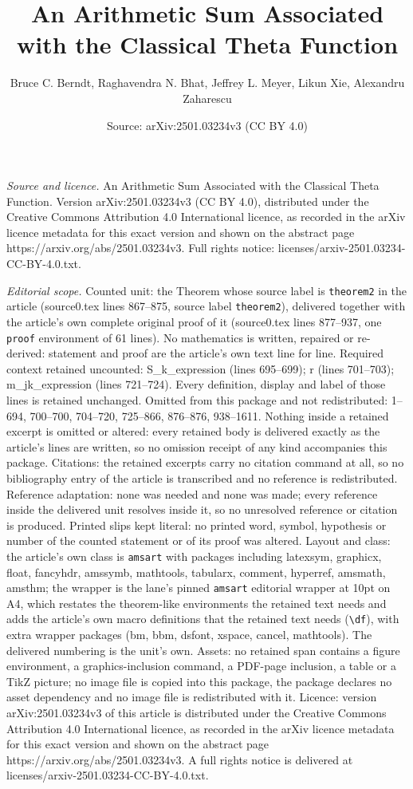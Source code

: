\documentclass[10pt,a4paper]{amsart}
\title[An Arithmetic Sum Associated with the Classical Theta Functi]{An Arithmetic Sum Associated with the Classical Theta Function}
\author{Bruce C. Berndt, Raghavendra N. Bhat, Jeffrey L. Meyer, Likun Xie, Alexandru Zaharescu}
\date{Source: arXiv:2501.03234v3 (CC BY 4.0)}
\begin{document}
\maketitle

\noindent\emph{Source and licence.} An Arithmetic Sum Associated with the Classical Theta Function. Version arXiv:2501.03234v3 (CC BY 4.0), distributed under the Creative Commons Attribution 4.0 International licence, as recorded in the arXiv licence metadata for this exact version and shown on the abstract page https://arxiv.org/abs/2501.03234v3. Full rights notice: licenses/arxiv-2501.03234-CC-BY-4.0.txt.\par\smallskip

\noindent\textit{Editorial scope.} Counted unit: the Theorem whose source label is \texttt{theorem2} in the article (source0.tex lines 867--875, source label \texttt{theorem2}), delivered together with the article's own complete original proof of it (source0.tex lines 877--937, one \texttt{proof} environment of 61 lines). No mathematics is written, repaired or re-derived: statement and proof are the article's own text line for line. Required context retained uncounted: S\_k\_expression (lines 695--699); r (lines 701--703); m\_jk\_expression (lines 721--724). Every definition, display and label of those lines is retained unchanged. Omitted from this package and not redistributed: 1--694, 700--700, 704--720, 725--866, 876--876, 938--1611. Nothing inside a retained excerpt is omitted or altered: every retained body is delivered exactly as the article's lines are written, so no omission receipt of any kind accompanies this package. Citations: the retained excerpts carry no citation command at all, so no bibliography entry of the article is transcribed and no reference is redistributed. Reference adaptation: none was needed and none was made; every reference inside the delivered unit resolves inside it, so no unresolved reference or citation is produced. Printed slips kept literal: no printed word, symbol, hypothesis or number of the counted statement or of its proof was altered. Layout and class: the article's own class is \texttt{amsart} with packages including latexsym, graphicx, float, fancyhdr, amssymb, mathtools, tabularx, comment, hyperref, amsmath, amsthm; the wrapper is the lane's pinned \texttt{amsart} editorial wrapper at 10pt on A4, which restates the theorem-like environments the retained text needs and adds the article's own macro definitions that the retained text needs (\texttt{\textbackslash df}), with extra wrapper packages (bm, bbm, dsfont, xspace, cancel, mathtools). The delivered numbering is the unit's own. Assets: no retained span contains a figure environment, a graphics-inclusion command, a PDF-page inclusion, a table or a TikZ picture; no image file is copied into this package, the package declares no asset dependency and no image file is redistributed with it. Licence: version arXiv:2501.03234v3 of this article is distributed under the Creative Commons Attribution 4.0 International licence, as recorded in the arXiv licence metadata for this exact version and shown on the abstract page https://arxiv.org/abs/2501.03234v3. A full rights notice is delivered at licenses/arxiv-2501.03234-CC-BY-4.0.txt. 
\end{document}
